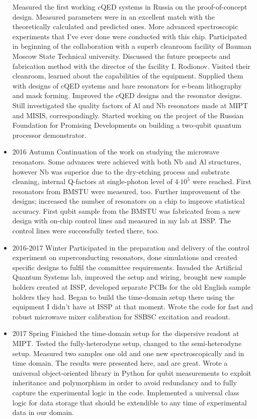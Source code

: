 \documentclass[12pt, twoside]{report}
\numberwithin{equation}{section}
\begin{document}
\begin{itemize}
\subitem Measured the first working cQED systems in Russia on the proof-of-concept design. Measured parameters were in an excellent match with the theoretically calculated and predicted ones. More advanced spectroscopic experiments that I've ever done were conducted with this chip.
\subitem Participated in beginning of the collaboration with a superb cleanroom facility of Bauman Moscow State Technical university. Discussed the future prospects and fabrication method with the director of the facility I. Rodionov. Visited their cleanroom, learned about the capabilities of the equipment.
\subitem Supplied them with designs of cQED systems and bare resonators for e-beam lithography and mask forming.
\subitem Improved the cQED designs and the resonator designs. 
\subitem Still investigated the quality factors of Al and Nb resonators made at MIPT and MISIS, correspondingly.
\subitem Started working on the project of the Russian Foundation for Promising Developments on building a two-qubit quantum processor demonstrator.
\item  2016 Autumn
\subitem Continuation of the work on studying the microwave resonators. Some advances were achieved with both Nb and Al structures, however Nb was superior due to the dry-etching process and substrate cleaning, internal Q-factors at single-photon level of 4$\cdot 10^{5}$ were reached. First resonators from BMSTU were measured, too.
\subitem Further improvement of the designs; increased the number of resonators on a chip to improve statistical accuracy.
\subitem First qubit sample from the BMSTU was fabricated from a new design with on-chip control lines and measured in my lab at ISSP. The control lines were successfully tested there, too. 
\item  2016-2017 Winter
\subitem Participated in the preparation and 	delivery of the control experiment on superconducting resonators, done simulations and created specific designs to fulfil the committee requirements.
\subitem Invaded the Artificial Quantum Systems lab, improved the setup and wiring, brought new sample holders created at ISSP, developed separate PCBs for the old English sample holders they had. 
\subitem Began to build the time-domain setup there using the equipment I didn't have at ISSP at that moment. Wrote the code for fast and robust microwave mixer calibration for SSBSC excitation and readout.
\item 2017 Spring
\subitem Finished the time-domain setup for the dispersive readout at MIPT. Tested the fully-heterodyne setup, changed to the semi-heterodyne setup.
\subitem Measured two samples one old and one new spectroscopically and in time domain. The results were presented here, and are great.
\subitem Wrote a universal object-oriented library  in Python for qubit measurements to exploit inheritance and polymorphism in order to avoid redundancy and to fully capture the experimental logic in the code. Implemented a universal class logic for data storage that should be extendible to any time of experimental data in our domain.
\end{itemize}
\end{document}
